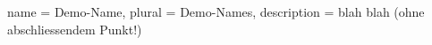{
	name = {Demo-Name},
	plural = {Demo-Names},
	description = {blah blah (ohne abschliessendem Punkt!)}
}

